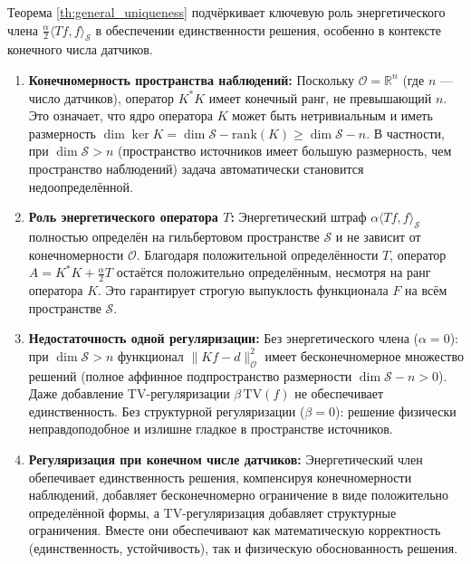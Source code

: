 \documentclass[a4paper,14pt,oneside,openany]{extarticle}
\begin{document}
\begin{remark}
Теорема \ref{th:general_uniqueness} подчёркивает ключевую роль энергетического члена $\frac{\alpha}{2}\langle Tf, 
f\rangle_{\mathcal{S}}$ в обеспечении единственности решения, особенно в контексте конечного числа датчиков.

\begin{enumerate}
    \item \textbf{Конечномерность пространства наблюдений:}
    Поскольку $\mathcal{O} = \mathbb{R}^n$ (где $n$ — число датчиков),
    оператор $K^*K$ имеет конечный ранг, не превышающий $n$. Это означает, что ядро оператора $K$ может быть нетривиальным и иметь размерность $\dim \ker K = \dim \mathcal{S} - \mathrm{rank}(K) \geq \dim \mathcal{S} - n$. В частности, при $\dim \mathcal{S} > n$ (пространство источников имеет большую размерность, чем пространство наблюдений) задача автоматически становится недоопределённой.
    
    \item \textbf{Роль энергетического оператора $T$:}
    Энергетический штраф $\alpha \langle Tf, f\rangle_{\mathcal{S}}$ 
    полностью определён на гильбертовом пространстве $\mathcal{S}$ и не зависит от конечномерности $\mathcal{O}$. Благодаря положительной определённости $T$, 
    оператор $A = K^*K + \frac{\alpha}{2}T$ остаётся положительно определённым, несмотря на ранг оператора $K$. 
    Это гарантирует строгую выпуклость функционала $F$ на всём пространстве $\mathcal{S}$.
    
    \item \textbf{Недостаточность одной регуляризации:} 
    Без энергетического члена ($\alpha=0$): при $\dim \mathcal{S} > n$ функционал $\|Kf-d\|_{\mathcal{O}}^2$ имеет 
    бесконечномерное множество решений (полное аффинное подпространство размерности $\dim \mathcal{S} - n > 0$). 
    Даже добавление TV-регуляризации $\beta\,\mathrm{TV}(f)$ не обеспечивает единственность.
    Без структурной регуляризации ($\beta=0$): решение физически неправдоподобное и
    излишне гладкое в пространстве источников.

    
    \item \textbf{Регуляризация при конечном числе датчиков:} Энергетический член обепечивает единственность решения, компенсируя
    конечномерности наблюдений, добавляет бесконечномерно ограничение в виде положительно определённой формы, 
    а TV-регуляризация добавляет структурные ограничения. Вместе они обеспечивают как математическую корректность (единственность, устойчивость), 
    так и физическую обоснованность решения.
    
\end{enumerate}
\end{remark}
\end{document}
